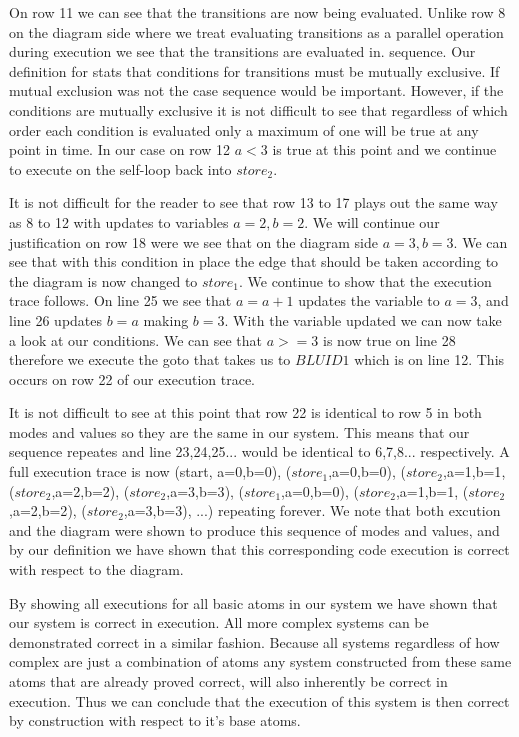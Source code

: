 On row 11 we can see that the transitions are now being evaluated. Unlike row 8 on the diagram side where
we treat evaluating transitions as a parallel operation during execution we see that the transitions are evaluated in. 
sequence. Our definition for \plcchart stats that conditions for transitions must be mutually exclusive.
If mutual exclusion was not the case sequence would be important. However, if the conditions are mutually
exclusive it is not difficult to see that regardless of which order each condition is evaluated only a maximum
of one will be true at any point in time. In our case on row 12 $a<3$ is true at this point and we continue to 
execute on the self-loop back into $store_2$.

It is not difficult for the reader to see that row 13 to 17 plays out the same way as 8 to 12 with updates to
variables $a=2, b=2$. We will continue our justification on row 18 were we see that on the diagram side $a=3,b=3$.
We can see that with this condition in place the edge that should be taken according to the diagram is now changed
to $store_1$. We continue to show that the execution trace follows. On line 25 we see that $a=a+1$ updates the 
variable to $a=3$, and line 26 updates $b=a$ making $b=3$. With the variable updated we can now take a look at our
conditions. We can see that $a >= 3$ is now true on line 28 therefore we execute the goto that takes us to $BLUID1$
which is on line 12. This occurs on row 22 of our execution trace.

It is not difficult to see at this point that row 22 is identical to row 5 in both modes and values so they are the
same in our system. This means that our sequence repeates and line 23,24,25... would be identical to 6,7,8... 
respectively. A full execution trace is now (start, {a=0,b=0}), ($store_1$,{a=0,b=0}), ($store_2$,{a=1,b=1},
($store_2$,{a=2,b=2}), ($store_2$,{a=3,b=3}), ($store_1$,{a=0,b=0}), ($store_2$,{a=1,b=1},
($store_2$,{a=2,b=2}), ($store_2$,{a=3,b=3}), ...) repeating forever. We note that both excution and the diagram
were shown to produce this sequence of modes and values, and by our definition we have shown that this 
corresponding code execution is correct with respect to the diagram. 

By showing all executions for all basic atoms in our system we have shown that our system is correct in execution.
All more complex systems can be demonstrated correct in a similar fashion. Because all systems regardless of how
complex are just a combination of atoms any system constructed from these same atoms that are already proved correct,
will also inherently be correct in execution. Thus we can conclude that the execution of this system is then correct
by construction with respect to it's base atoms.